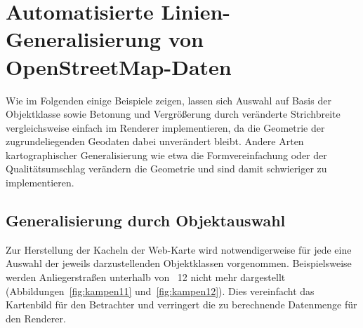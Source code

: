 \documentclass[../main/thesis.tex]{subfiles}
\begin{document}




\section{Automatisierte Linien-Generalisierung von OpenStreetMap-Daten}

Wie im Folgenden einige Beispiele zeigen, lassen sich Auswahl auf Basis der Objektklasse sowie Betonung und Vergrößerung durch veränderte Strichbreite vergleichsweise einfach im Renderer implementieren, da die Geometrie der zugrundeliegenden Geodaten dabei unverändert bleibt.
Andere Arten kartographischer Generalisierung wie etwa die Formvereinfachung oder der Qualitätsumschlag verändern die Geometrie und sind damit schwieriger zu implementieren.



\subsection{Generalisierung durch Objektauswahl}

Zur Herstellung der Kacheln der Web-Karte wird notwendigerweise für jede  eine Auswahl der jeweils darzustellenden Objektklassen vorgenommen.
Beispielsweise werden Anliegerstraßen  unterhalb von ~12 nicht mehr dargestellt (Abbildungen~\ref{fig:kampen11} und~\ref{fig:kampen12}).
Dies vereinfacht das Kartenbild für den Betrachter und verringert die zu berechnende Datenmenge für den Renderer.
\end{document}
